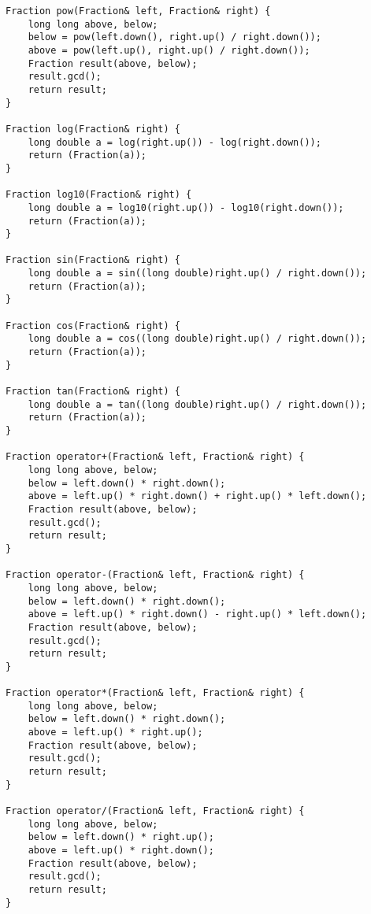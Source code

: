 \begin{lstlisting}
Fraction pow(Fraction& left, Fraction& right) {
    long long above, below;
    below = pow(left.down(), right.up() / right.down());
    above = pow(left.up(), right.up() / right.down());
    Fraction result(above, below);
    result.gcd();
    return result;
}

Fraction log(Fraction& right) {
    long double a = log(right.up()) - log(right.down());
    return (Fraction(a));
}

Fraction log10(Fraction& right) {
    long double a = log10(right.up()) - log10(right.down());
    return (Fraction(a));
}

Fraction sin(Fraction& right) {
    long double a = sin((long double)right.up() / right.down());
    return (Fraction(a));
}

Fraction cos(Fraction& right) {
    long double a = cos((long double)right.up() / right.down());
    return (Fraction(a));
}

Fraction tan(Fraction& right) {
    long double a = tan((long double)right.up() / right.down());
    return (Fraction(a));
}

Fraction operator+(Fraction& left, Fraction& right) {
    long long above, below;
    below = left.down() * right.down();
    above = left.up() * right.down() + right.up() * left.down();
    Fraction result(above, below);
    result.gcd();
    return result;
}

Fraction operator-(Fraction& left, Fraction& right) {
    long long above, below;
    below = left.down() * right.down();
    above = left.up() * right.down() - right.up() * left.down();
    Fraction result(above, below);
    result.gcd();
    return result;
}

Fraction operator*(Fraction& left, Fraction& right) {
    long long above, below;
    below = left.down() * right.down();
    above = left.up() * right.up();
    Fraction result(above, below);
    result.gcd();
    return result;
}
    
Fraction operator/(Fraction& left, Fraction& right) {
    long long above, below;
    below = left.down() * right.up();
    above = left.up() * right.down();
    Fraction result(above, below);
    result.gcd();
    return result;
}  
\end{lstlisting}

